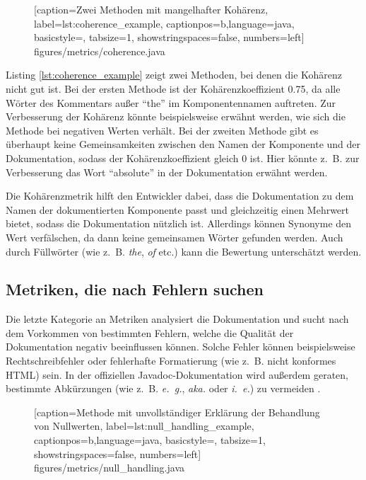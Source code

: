 	\begin{figure}[ht!]
			
			[caption={Zwei Methoden mit mangelhafter Kohärenz},
			label={lst:coherence_example},
			captionpos=b,language=java, basicstyle=\footnotesize, tabsize=1, showstringspaces=false,  numbers=left]
			{figures/metrics/coherence.java}
	\end{figure}
		
 Listing \ref{lst:coherence_example} zeigt zwei Methoden, bei denen die Kohärenz nicht gut ist. Bei der ersten Methode ist der Kohärenzkoeffizient 0.75, da alle Wörter des Kommentars außer \enquote{the} im Komponentennamen auftreten. Zur Verbesserung der Kohärenz könnte beispielsweise erwähnt werden, wie sich die Methode bei negativen Werten verhält. Bei der zweiten Methode gibt es überhaupt keine Gemeinsamkeiten zwischen den Namen der Komponente und der Dokumentation, sodass der Kohärenzkoeffizient gleich 0 ist. Hier könnte z.~B. zur Verbesserung  das Wort \enquote{absolute} in der Dokumentation erwähnt werden.

Die Kohärenzmetrik hilft den Entwickler dabei, dass die Dokumentation zu dem Namen der dokumentierten Komponente passt und gleichzeitig einen Mehrwert bietet, sodass die Dokumentation nützlich ist. Allerdings können Synonyme den Wert verfälschen, da dann keine gemeinsamen Wörter gefunden werden. Auch durch Füllwörter (wie z.~B. \textit{the}, \textit{of} etc.) kann die Bewertung unterschätzt werden.

\subsection{Metriken, die  nach Fehlern suchen}\label{chapter:metrics_errors}

Die letzte Kategorie an Metriken analysiert die Dokumentation und sucht nach dem Vorkommen von bestimmten Fehlern, welche die Qualität der Dokumentation negativ beeinflussen können. Solche Fehler können beispielsweise Rechtschreibfehler oder fehlerhafte Formatierung (wie z.~B. nicht konformes \ac{HTML}) sein. In der offiziellen Javadoc-Dokumentation wird außerdem geraten, bestimmte Abkürzungen (wie z.~B. \textit{e.~g.}, \textit{aka.} oder \textit{i.~e.}) zu vermeiden \cite{HowtoWriteDocCommentsfortheJavadocTool}. 

		\begin{figure}[ht!]
			
			[caption={Methode mit unvollständiger Erklärung der Behandlung von Nullwerten},
			label={lst:null_handling_example},
			captionpos=b,language=java, basicstyle=\footnotesize, tabsize=1, showstringspaces=false,  numbers=left]
			{figures/metrics/null_handling.java}
		\end{figure}
		
